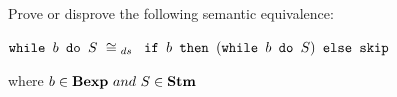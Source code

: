 \newcommand{\exTen}
{
	$ \wbS{b}{S} ~\cong{}_{ds}~$
	{$\ifABC{b}{(\wbS{b}{S})}{\skipistr}$}
}
{
	Prove or disprove the following semantic equivalence:
	\begin{center}
		\exTen{}
	\end{center}
	where $b\in\mbox{\textbf{Bexp}}~and~S\in\mbox{\textbf{Stm}}$
}
{}
